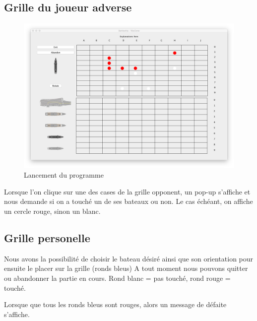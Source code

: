 \documentclass[a4paper,10pt]{article}
\begin{document}
\subsection{Grille du joueur adverse}

\begin{figure}[H]
    \center
    \includegraphics[scale=0.35]{images/encours}
    \caption{Lancement du programme}
    \label{fig:my_label}
\end{figure}

Lorsque l'on clique sur une des cases de la grille opponent, un pop-up s'affiche et nous demande si on a touché un de ses bateaux ou non. Le cas échéant, on affiche un cercle rouge, sinon un blanc.

\subsection{Grille personelle}

Nous avons la possibilité de choisir le bateau désiré ainsi que son orientation pour ensuite le placer sur la grille (ronds bleus)
A tout moment nous pouvons quitter ou abandonner la partie en cours.
\noindent Rond blanc = pas touché, rond rouge = touché.

\noindent Lorsque que tous les ronds bleus sont rouges, alors un message de défaite s'affiche.
\end{document}
